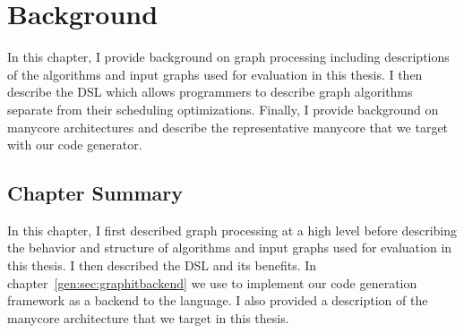 \chapter{Background}\label{gen:sec:background}

In this chapter, I provide background on graph processing including descriptions of the algorithms and input graphs used for evaluation in this thesis.
I then describe the \graphit DSL which allows programmers to describe graph algorithms separate from their scheduling optimizations.
Finally, I provide background on manycore architectures and describe the representative manycore that we target with our code generator. 







\section{Chapter Summary}
In this chapter, I first described graph processing at a high level before describing the behavior and structure of algorithms and input graphs used for evaluation in this thesis.
I then described the \graphit DSL and its benefits.
In chapter~\ref{gen:sec:graphitbackend} we use \graphit to implement our code generation framework as a backend to the language.
I also provided a description of the manycore architecture that we target in this thesis.